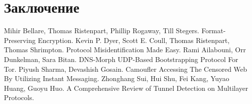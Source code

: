 \section{Заключение}

\newpage

\begin{thebibliography}{9}
\bibitem {} Mihir Bellare, Thomas Ristenpart, Phillip Rogaway, Till Stegers. Format-Preserving Encryption.
\bibitem {} Kevin P. Dyer, Scott E. Coull, Thomas Ristenpart, Thomas Shrimpton. Protocol Misidentification Made Easy.
\bibitem {} Rami Ailabouni, Orr Dunkelman, Sara Bitan. DNS-Morph UDP-Based Bootstrapping Protocol For Tor.
\bibitem {} Piyush Sharma, Devashish Gosain. Camoufler Accessing The Censored Web By Utilizing Instant Messaging.
\bibitem {} Zhonghang Sui, Hui Shu, Fei Kang, Yuyao Huang, Guoyu Huo. A Comprehensive Review of Tunnel Detection on Multilayer Protocols.
\end{thebibliography}



